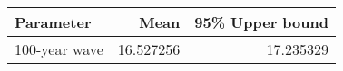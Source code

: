 \begin{tabular}{lrr}
\toprule
     Parameter &       Mean &  95\% Upper bound \\
\midrule
 100-year wave &  16.527256 &         17.235329 \\
\bottomrule
\end{tabular}
